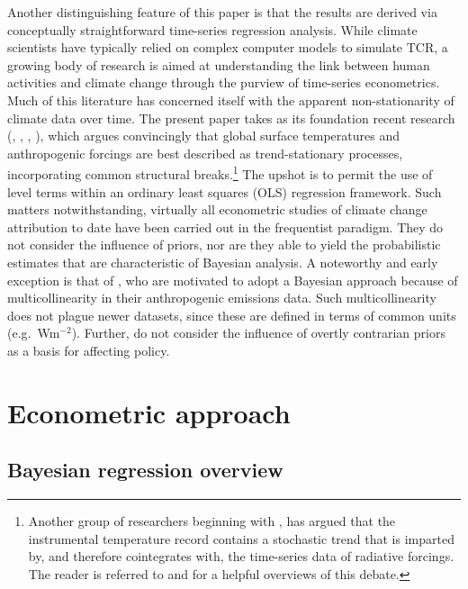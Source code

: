\documentclass[smallextended]{svjour3}       %
\begin{document}
Another distinguishing feature of this paper is that the results are
derived via conceptually straightforward time-series regression
analysis. While climate scientists have typically relied on complex
computer models to simulate TCR, a growing body of research is aimed at
understanding the link between human activities and climate change
through the purview of time-series econometrics. Much of this literature
has concerned itself with the apparent non-stationarity of climate data
over time. The present paper takes as its foundation recent research
(\cite{gay2009global}, \cite{estrada2013statistically},
\cite{estrada2013time}, \cite{kim2020inference}), which argues
convincingly that global surface temperatures and anthropogenic forcings
are best described as trend-stationary processes, incorporating common
structural breaks.\footnote{Another group of researchers beginning with
  \cite{stern2000detecting}, has argued that the instrumental
  temperature record contains a stochastic trend that is imparted by,
  and therefore cointegrates with, the time-series data of radiative
  forcings. The reader is referred to \cite{estrada2013detection} and
  \cite{hillebrand2020econometric} for a helpful overviews of this
  debate.} The upshot is to permit the use of level terms within an
ordinary least squares (OLS) regression framework. Such matters
notwithstanding, virtually all econometric studies of climate change
attribution to date have been carried out in the frequentist paradigm.
They do not consider the influence of priors, nor are they able to yield
the probabilistic estimates that are characteristic of Bayesian
analysis. A noteworthy and early exception is that of
\cite{tol1998bayes}, who are motivated to adopt a Bayesian approach
because of multicollinearity in their anthropogenic emissions data. Such
multicollinearity does not plague newer datasets, since these are
defined in terms of common units (e.g.~Wm\(^{-2}\)). Further,
\cite{tol1998bayes} do not consider the influence of overtly contrarian
priors as a basis for affecting policy.

\hypertarget{sec:econometric}{%
\section{Econometric approach}\label{sec:econometric}}

\hypertarget{sec:bayesian}{%
\subsection{Bayesian regression overview}\label{sec:bayesian}}
\end{document}

